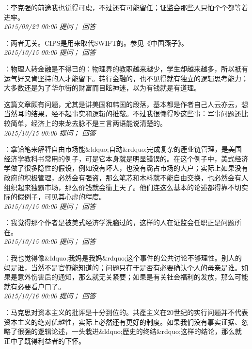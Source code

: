 \documentclass[twocolumn]{ctexart}
\begin{document}
：李克强的前途我也觉得可虑，不过还有可能留任；证监会那些人只怕个个都等着进牢。\\

\textit{\hfill\noindent\small 2015/09/23 00:00 提问； 回答}

：两者无关。CIPS是用来取代SWIFT的。参见《中国燕子》。\\

\textit{\hfill\noindent\small 2015/10/15 00:00 提问； 回答}

：物理人转金融是不得已的：物理界的教职越来越少，学生却越来越多，所以衹有运气好又肯坚持的人才能留下。转行金融的，也不见得就有独立的逻辑思考能力；大多数还是为了华尔街的财富而目眩神迷，以为有钱就是有道理。

这篇文章颇有问题，尤其是讲美国和韩国的段落，基本都是作者自己人云亦云，想当然耳的结果，经不起事实和逻辑的推敲。不过我很懒得吵这些事：军事问题还比较简单，经济上的来龙去脉不是三言两语能说清楚的。\\

\textit{\hfill\noindent\small 2015/10/15 00:00 提问； 回答}

：拿铅笔来解释自由市场能\&ldquo;自动\&rdquo;完成复杂的產业链管理，是美国经济学教科书常用的例子，可是它本身就是明显错误的。在这个例子中，美式经济学做了很多隐性的假设，例如没有坏人，也没有霸占市场的大户；实际上如果没有政府的积极管理，必然会有强盗，那么笔芯和木料就不能自由交换，也必然会有人组织起来独霸市场，那么价钱就会衝上天了。他们连这么基本的论述都得靠不切实际的假例子，可见其心虚的程度。\\

\textit{\hfill\noindent\small 2015/10/15 00:00 提问； 回答}

：我觉得那个作者是被美式经济学洗脑过的，这样的人在证监会任职正是问题所在。\\

\textit{\hfill\noindent\small 2015/10/15 00:00 提问； 回答}

：我也觉得像\&ldquo;我妈是我妈\&rdquo;这个事件的公共讨论不够理性。别人的妈是谁，当然不是官僚能知道的；问题只在于是否有必要确认个人的母亲是谁。如果是意外伤害后的通知，那么就无关紧要；如果是有关社会福利的发放，那么可能就有必要看户口了。\\

\textit{\hfill\noindent\small 2015/10/16 00:00 提问； 回答}

：马克思对资本主义的批评是十分到位的。共產主义在20世纪的实行问题并不代表资本主义的绝对优越性，实际上必然还有更好的制度。如果我们没有事实证据、忽略了很强的逻辑论述，一头栽进\&ldquo;歷史的终结\&rdquo;这样的结论，那么就正中了既得利益者的下怀。\\
\end{document}

